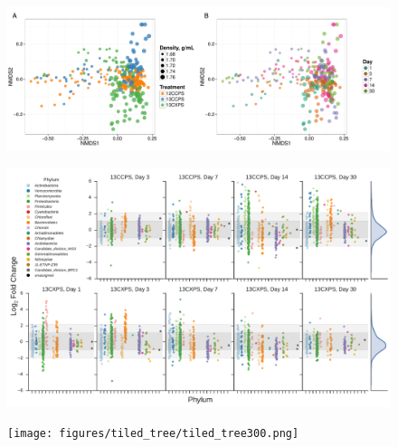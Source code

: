 \thispagestyle{empty}


\begin{figure}[H] \begin{center}
    \centerline{\includegraphics[width=15.4cm]{figures/ordination_all1/ordination_all.pdf}}
    \caption{\protect}\label{fig:ord}
\end{center} \end{figure}


\begin{figure}[H]
	\begin{center}
	\centerline{\includegraphics[width=15.4cm]{figures/l2fc_fig1/l2fc_fig.pdf}}
	\caption{\protect}\label{fig:l2fc}
        \end{center}
\end{figure}

\begin{figure}[H]
	\begin{center}
    \centerline{\texttt{[image: figures/tiled\_tree/tiled\_tree300.png]}}
    \caption[Phylogenetic trees]{\protect}\label{fig:tiledtree}
    \end{center} 
\end{figure}

